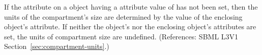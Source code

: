 If the attribute  on a \Compartment object having a
 attribute value of  has not been set, then
the units of the compartment's size are determined by the value of the
enclosing \Model object's  attribute.  If neither the
\Compartment object's  nor the enclosing \Model object's
 attributes are set, the units of compartment size are
undefined.  (References: SBML L3V1 Section~\ref{sec:compartment-units}.)
